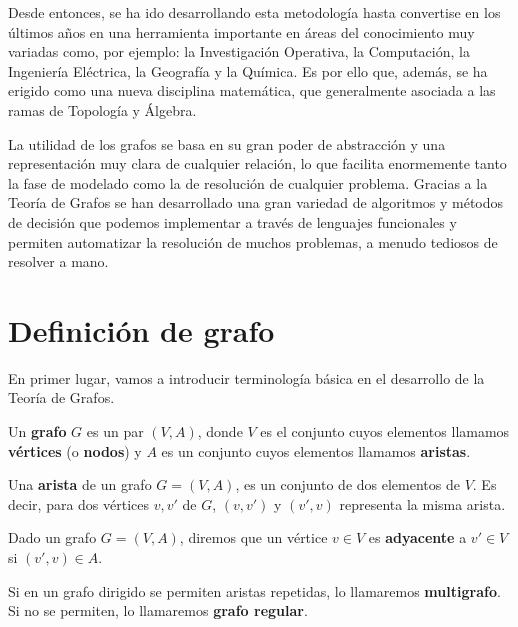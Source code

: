 Desde entonces, se ha ido desarrollando esta metodología hasta convertise en
los últimos años en una herramienta importante en áreas del conocimiento muy
variadas como, por ejemplo: la Investigación Operativa, la Computación, la
Ingeniería Eléctrica, la Geografía y la Química. Es por ello que, además, se ha
erigido como una nueva disciplina matemática, que generalmente asociada a las
ramas de Topología y Álgebra.

La utilidad de los grafos se basa en su gran poder de abstracción y una
representación muy clara de cualquier relación, lo que facilita enormemente
tanto la fase de modelado como la de resolución de cualquier problema. Gracias
a la Teoría de Grafos se han desarrollado una gran variedad de algoritmos y
métodos de decisión que podemos implementar a través de lenguajes funcionales y
permiten automatizar la resolución de muchos problemas, a menudo tediosos de
resolver a mano.


\minitoc

\section{Definición de grafo}

En primer lugar, vamos a introducir terminología básica en el 
desarrollo de la Teoría de Grafos.

\begin{definicion}
  Un \textbf{grafo} $G$ es un par $(V,A)$, donde $V$ es el conjunto 
  cuyos elementos llamamos \textbf{vértices} (o \textbf{nodos}) y 
  $A$ es un conjunto cuyos elementos llamamos \textbf{aristas}. 
\end{definicion}

\begin{definicion}
  Una \textbf{arista} de un grafo $G = (V,A)$, es un conjunto de dos elementos
  de $V$. Es decir, para dos vértices $v,v'$ de $G$, $(v,v')$ y $(v',v)$
  representa la misma arista.
\end{definicion}

\begin{definicion}
  Dado un grafo $G = (V,A)$, diremos que un vértice $v \in V$ es 
  \textbf{adyacente} a $v' \in V$ si $(v',v) \in A$. 
\end{definicion}

\begin{definicion}
  Si en un grafo dirigido se permiten aristas repetidas, lo llamaremos 
  \textbf{multigrafo}. Si no se permiten, lo llamaremos 
  \textbf{grafo regular}.
\end{definicion}

